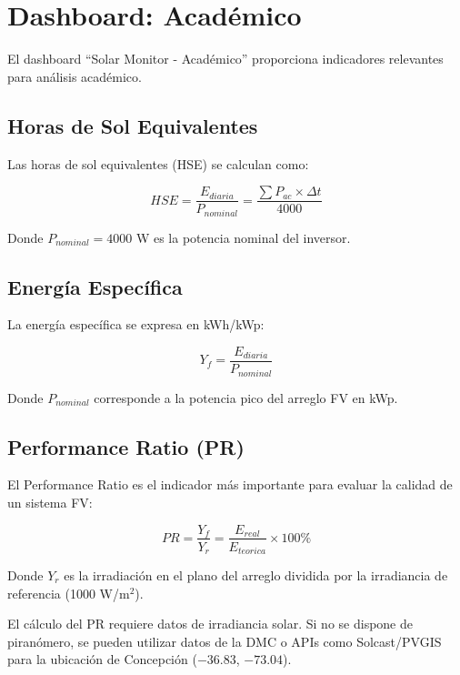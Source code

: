\documentclass[12pt,a4paper]{article}
\begin{document}
\section{Dashboard: Acad\'emico}

El dashboard ``Solar Monitor - Acad\'emico'' proporciona indicadores relevantes para an\'alisis acad\'emico.

\subsection{Horas de Sol Equivalentes}

Las horas de sol equivalentes (HSE) se calculan como:

$$HSE = \frac{E_{diaria}}{P_{nominal}} = \frac{\sum P_{ac} \times \Delta t}{4000}$$

Donde $P_{nominal} = 4000$ W es la potencia nominal del inversor.

\subsection{Energ\'ia Espec\'ifica}

La energ\'ia espec\'ifica se expresa en kWh/kWp:

$$Y_f = \frac{E_{diaria}}{P_{nominal}}$$

Donde $P_{nominal}$ corresponde a la potencia pico del arreglo FV en kWp.

\subsection{Performance Ratio (PR)}

El Performance Ratio es el indicador m\'as importante para evaluar la calidad de un sistema FV:

$$PR = \frac{Y_f}{Y_r} = \frac{E_{real}}{E_{teorica}} \times 100\%$$

Donde $Y_r$ es la irradiaci\'on en el plano del arreglo dividida por la irradiancia de referencia (1000 W/m$^2$).

\begin{infobox}
El c\'alculo del PR requiere datos de irradiancia solar. Si no se dispone de piran\'omero, se pueden utilizar datos de la DMC o APIs como Solcast/PVGIS para la ubicaci\'on de Concepci\'on ($-36.83$, $-73.04$).
\end{infobox}
\end{document}

